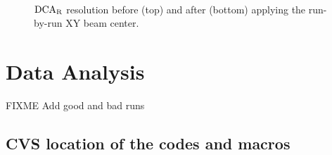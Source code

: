 \documentclass[12pt]{article}
\newcommand{\dcar}{$\rm{DCA}_{R}$ }
\begin{document}
\begin{figure}[t!]
\begin{center}
 \\
  \caption{\dcar resolution before (top) and after (bottom) applying the run-by-run XY beam center.}
  \label{fig:VTXBeamCenter}
\end{center}
\end{figure}  



\newpage

\section{Data Analysis}
\label{sec:DataAnalysis}

{\color{red}FIXME}
{\color{red}Add good and bad runs}

\subsection{CVS location of the codes and macros}
\label{sec:CVS}
\end{document}
